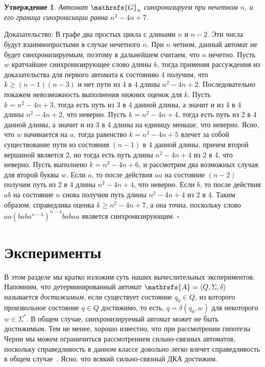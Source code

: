 \documentclass[11pt]{article}
\newtheorem{theorem}{Утверждение}
\newenvironment{proof}{Доказательство:}{$\square$}
\begin{document}
\begin{theorem}
Автомат $\mathrsfs{G}_n$ синхронизируем при нечетном $n$, и его граница синхронизации равна $n^2 - 4n + 7$.
\end{theorem}

\begin{proof}
В графе два простых цикла с длинами $n$ и $n - 2$. Эти числа будут взаимнопростыми в случае нечетного $n$. При $n$ четном, данный автомат не будет 
синхронизируемым, поэтому в дальнейшем считаем, что $n$ нечетно. Пусть $w$ кратчайшее синхронизирующее слово длины $k$, тогда применяя рассуждения из доказательства
для первого автомата к состоянию 4 получим, что $k \ge (n - 1)(n - 3)$ и нет пути из 4 в 4 длины $n^2 - 4n + 2$. Последовательно покажем невозможность выполнения 
нижних оценок для $k$. Пусть $k = n^2 - 4n + 3$, тогда есть путь из 3 в 4 данной длины, а значит и из 4 в 4 длины $n^2 - 4n + 2$, что неверно.
Пусть $k = n^2 - 4n + 4$, тогда есть путь из 2 в 4 данной длины, а значит и из 3 в 4 длины на единицу меньше, что неверно. Ясно, что $w$ начинается на $a$, тогда
равенство $k = n^2 - 4n + 5$ влечет за собой существование пути из состояния $(n - 1)$ в 4 данной длины, причем второй вершиной является 2, но тогда есть путь 
длины $n^2 - 4n + 4$
из 2 в 4, что неверно. Пусть выполнено $k = n^2 - 4n + 6$, и рассмотрим два возможных случая для второй буквы $w$. Если $a$, то после действия $aa$ на 
состояние $(n - 2)$ получим путь из 2 в 4 длины $n ^2 - 4n + 4$, что неверно. Если $b$, то после действия $ab$ на состояние $n$ снова получим путь длины $n^2 - 4n + 4$
из 2 в 4. Таким образом, справедлива оценка $k \ge n^2 - 4n + 7$, а она точна, поскольку слово $aa(baba^{n - 3})^{n - 4}babaa$ является синхронизирующим.
\end{proof}

\section{Эксперименты}
\label{experiments}
В этом разделе мы кратко изложим суть наших вычеслительных экспериментов.
Напомним, что детерминированный автомат $\mathrsfs{A}=\langle Q,\Sigma,\delta\rangle$ называется
\emph{достижимым}, если существует состояние $q_0\in Q$, из которого произвольное состояние 
$q\in Q$ достижимо, то есть, $q=\delta(q_0,w)$ для некоторого $w\in\Sigma^*$. В общем случае,
синхронизируемый автомат может не быть достижимым. Тем не менее, хорошо известно,
что при рассмотрении гипотезы Черни мы можем ограничиться рассмотрением сильно-связных автоматов,
поскольку справедливость в данном классе довольно легко влечет справедливость в общем
случае~\cite{Pi78}. Ясно, что всякий сильно-связный ДКА достижим.
\end{document}
